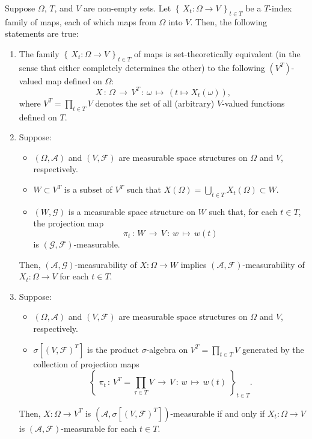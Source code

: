 \begin{theorem}
\mbox{}\vskip 0.1cm
\noindent
Suppose $\Omega$, $T$, and $V$ are non-empty sets.
Let $\left\{\,X_{t} : \Omega \longrightarrow V \,\right\}_{t \in T}$
be a $T$-index family of maps, each of which maps from $\Omega$ into $V$.
Then, the following statements are true:
\begin{enumerate}
\item	The family $\left\{\,X_{t} : \Omega \longrightarrow V \,\right\}_{t \in T}$
		of maps is set-theoretically equivalent (in the sense that either completely determines the other)
		to the following $(V^{T})$-valued map defined on $\Omega$:
		\begin{equation*}
		X \,:\, \Omega \,\longrightarrow\, V^{T} \,:\, \omega \,\longmapsto\, \left(t \longmapsto X_{t}(\omega)\right),
		\end{equation*}
		where $V^{T} = \prod_{t\in T}V$ denotes the set of all (arbitrary) $V$-valued functions defined on $T$.
\item	Suppose:
		\begin{itemize}
		\item $\left(\Omega,\mathcal{A}\right)$ and $\left(V,\mathcal{F}\right)$
			are measurable space structures on $\Omega$ and $V$, respectively.
		\item $W \subset V^{T}$ is a subset of $V^{T}$
			such that $X(\Omega) = \bigcup_{t \in T}X_{t}(\Omega) \subset W$.
		\item $\left(W,\mathcal{G}\right)$ is a measurable space structure on $W$
			such that, for each $t \in T$, the projection map
			\begin{equation*}
			\pi_{t} \,:\, W \,\longrightarrow\, V \,:\, w \,\longmapsto\, w(t)
			\end{equation*}
			is $\left(\mathcal{G},\mathcal{F}\right)$-measurable.
		\end{itemize}
		Then, $\left(\mathcal{A},\mathcal{G}\right)$-measurability of $X : \Omega \longrightarrow W$
		implies
		$(\mathcal{A},\mathcal{F})$-measurability of $X_{t} : \Omega \longrightarrow V$ for each $t \in T$.
\item	Suppose:
		\begin{itemize}
		\item $\left(\Omega,\mathcal{A}\right)$ and $\left(V,\mathcal{F}\right)$
			are measurable space structures on $\Omega$ and $V$, respectively.
		\item $\sigma[\left(V,\mathcal{F}\right)^{T}]$ is the product $\sigma$-algebra
			on $V^{T} = \prod_{t \in T}V$ generated by the collection of projection maps
			\begin{equation*}
			\left\{\;
			\pi_{t} \,:\, V^{T} = \prod_{\tau \in T}V \,\longrightarrow\, V \,:\, w \,\longmapsto\, w(t)
			\;\right\}_{t \in T}.
			\end{equation*}
		\end{itemize}
		Then, $X : \Omega \longrightarrow V^{T}$ is
		$\left(\mathcal{A},\sigma[\left(V,\mathcal{F}\right)^{T}]\right)$-measurable
		if and only if
		$X_{t} : \Omega \longrightarrow V$ is $(\mathcal{A},\mathcal{F})$-measurable for each $t \in T$.
\end{enumerate}
\end{theorem}
